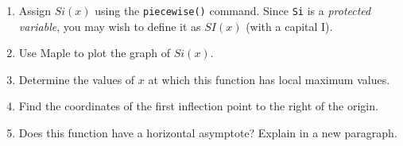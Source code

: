 \begin{enumerate}
    \item   Assign $Si(x)$ using the \texttt{piecewise()} command.  Since \texttt{Si} is a \textit{protected variable}, you may wish to define it as $SI(x)$ (with a capital I). 
    \item   Use Maple to plot the graph of $Si(x)$.
    \item   Determine the values of $x$ at which this function has local maximum values.
    \item   Find the coordinates of the first inflection point to the right of the origin.
    \item   Does this function have a horizontal asymptote? Explain in a new paragraph.
\end{enumerate}
